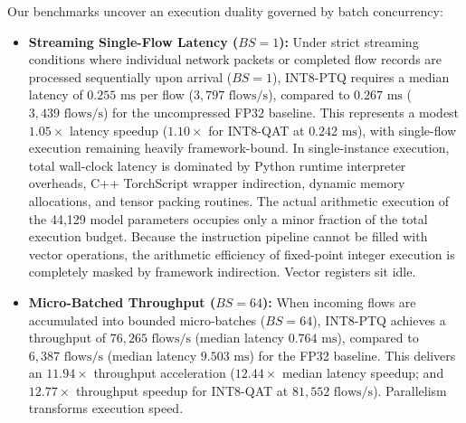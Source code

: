 \documentclass[conference]{IEEEtran}
\begin{document}
Our benchmarks uncover an execution duality governed by batch concurrency:
\begin{itemize}
    \item \textbf{Streaming Single-Flow Latency ($BS = 1$):} Under strict streaming conditions where individual network packets or completed flow records are processed sequentially upon arrival ($BS = 1$), INT8-PTQ requires a median latency of $0.255\text{ ms}$ per flow ($3,797\text{ flows/s}$), compared to $0.267\text{ ms}$ ($3,439\text{ flows/s}$) for the uncompressed FP32 baseline. This represents a modest $1.05\times$ latency speedup ($1.10\times$ for INT8-QAT at $0.242\text{ ms}$), with single-flow execution remaining heavily framework-bound. In single-instance execution, total wall-clock latency is dominated by Python runtime interpreter overheads, C++ TorchScript wrapper indirection, dynamic memory allocations, and tensor packing routines. The actual arithmetic execution of the 44,129 model parameters occupies only a minor fraction of the total execution budget. Because the instruction pipeline cannot be filled with vector operations, the arithmetic efficiency of fixed-point integer execution is completely masked by framework indirection. Vector registers sit idle.
    \item \textbf{Micro-Batched Throughput ($BS = 64$):} When incoming flows are accumulated into bounded micro-batches ($BS = 64$), INT8-PTQ achieves a throughput of $76,265\text{ flows/s}$ (median latency $0.764\text{ ms}$), compared to $6,387\text{ flows/s}$ (median latency $9.503\text{ ms}$) for the FP32 baseline. This delivers an $11.94\times$ throughput acceleration ($12.44\times$ median latency speedup; and $12.77\times$ throughput speedup for INT8-QAT at $81,552\text{ flows/s}$). Parallelism transforms execution speed.
\end{itemize}
\end{document}
